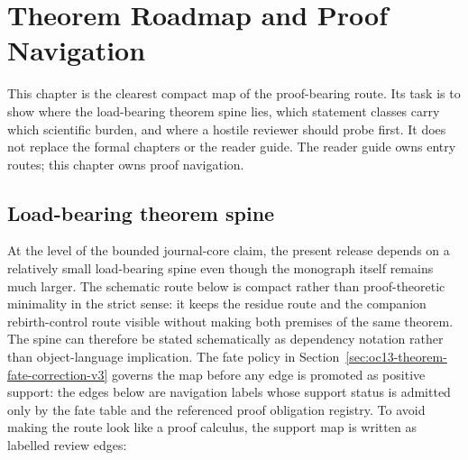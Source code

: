 \section{Theorem Roadmap and Proof Navigation}
\label{sec:oc13-theorem-roadmap}

This chapter is the clearest compact map of the proof-bearing route. Its task is
to show where the load-bearing theorem spine lies, which statement classes carry
which scientific burden, and where a hostile reviewer should probe first. It
does not replace the formal chapters or the reader guide. The reader guide owns
entry routes; this chapter owns proof navigation.

\subsection{Load-bearing theorem spine}

At the level of the bounded journal-core claim, the present release depends on
a relatively small load-bearing spine even though the monograph itself remains
much larger. The schematic route below is compact rather than proof-theoretic
minimality in the strict sense: it keeps the residue route and the companion
rebirth-control route visible without making both premises of the same theorem.
The spine can therefore be stated schematically as dependency notation rather
than object-language implication. The fate policy in
Section~\ref{sec:oc13-theorem-fate-correction-v3} governs the map before any
edge is promoted as positive support: the edges below are navigation labels
whose support status is admitted only by the fate table and the referenced proof
obligation registry. To avoid making the route look like a proof calculus, the
support map is written as labelled review edges:

